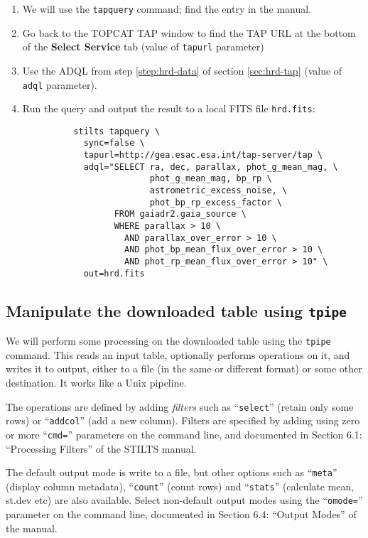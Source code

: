 \documentclass{article}
\newcommand{\lab}[1]{{\bf #1}}
\begin{document}
\begin{enumerate}
\item We will use the {\tt tapquery} command;
      find the entry in the manual.
\item Go back to the TOPCAT TAP window to find the TAP URL at the
      bottom of the \lab{Select Service} tab (value of {\tt tapurl} parameter)
\item Use the ADQL from step \ref{step:hrd-data} of section \ref{sec:hrd-tap}
      (value of {\tt adql} parameter).
\item Run the query and output the result to a local FITS file {\tt hrd.fits}:
      \begin{verbatim}
          stilts tapquery \
            sync=false \
            tapurl=http://gea.esac.esa.int/tap-server/tap \
            adql="SELECT ra, dec, parallax, phot_g_mean_mag, \
                         phot_g_mean_mag, bp_rp \
                         astrometric_excess_noise, \
                         phot_bp_rp_excess_factor \
                  FROM gaiadr2.gaia_source \
                  WHERE parallax > 10 \
                    AND parallax_over_error > 10 \
                    AND phot_bp_mean_flux_over_error > 10 \
                    AND phot_rp_mean_flux_over_error > 10" \
            out=hrd.fits
      \end{verbatim}
\end{enumerate}

\subsection{Manipulate the downloaded table using {\tt tpipe}}

We will perform some processing on the downloaded table using
the {\tt tpipe} command.
This reads an input table, optionally performs operations on it,
and writes it to output, either to a file (in the same or different format)
or some other destination.  It works like a Unix pipeline.

The operations are defined by adding {\em filters} such as
``{\tt select}'' (retain only some rows) or ``{\tt addcol}''
(add a new column).  Filters are specified by adding using zero
or more ``{\tt cmd=}'' parameters on the command line,
and documented in Section 6.1: ``Processing Filters'' of the STILTS manual.

The default output mode is write to a file,
but other options such as ``{\tt meta}'' (display column metadata),
``{\tt count}'' (count rows) and ``{\tt stats}'' (calculate mean, st.dev etc)
are also available.
Select non-default output modes using the ``{\tt omode=}'' parameter
on the command line, documented in Section 6.4: ``Output Modes'' of the manual.
\end{document}
